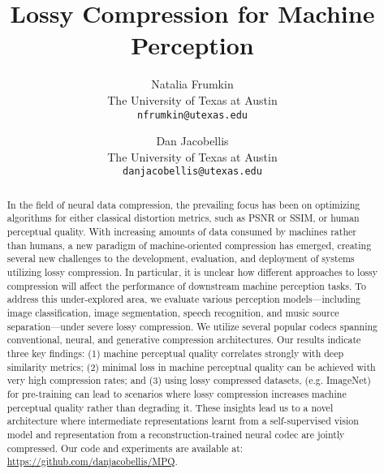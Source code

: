 \documentclass[10pt,twocolumn,letterpaper]{article}
\begin{document}
\title{Lossy Compression for Machine Perception}

\author{Natalia Frumkin\\
The University of Texas at Austin\\
{\tt\small nfrumkin@utexas.edu}
\and
Dan Jacobellis\\
The University of Texas at Austin\\
{\tt\small danjacobellis@utexas.edu}
}

\maketitle


\begin{abstract}
In the field of neural data compression, the prevailing focus has been on optimizing algorithms for either classical distortion metrics, such as PSNR or SSIM, or human perceptual quality. With increasing amounts of data consumed by machines rather than humans, a new paradigm of machine-oriented compression has emerged, creating several new challenges to the development, evaluation, and deployment of systems utilizing lossy compression. In particular, it is unclear how different approaches to lossy compression will affect the performance of downstream machine perception tasks. To address this under-explored area, we evaluate various perception models—including image classification, image segmentation, speech recognition, and music source separation—under severe lossy compression. We utilize several popular codecs spanning conventional, neural, and generative compression architectures. Our results indicate three key findings: (1) machine perceptual quality correlates strongly with deep similarity metrics; (2) minimal loss in machine perceptual quality can be achieved with very high compression rates; and (3) using lossy compressed datasets, (e.g. ImageNet) for pre-training can lead to scenarios where lossy compression increases machine perceptual quality rather than degrading it. These insights lead us to a novel architecture where intermediate representations learnt from a self-supervised vision model and representation from a reconstruction-trained neural codec are jointly compressed. Our code and experiments are available at: \url{https://github.com/danjacobellis/MPQ}.
\end{abstract}
\end{document}

